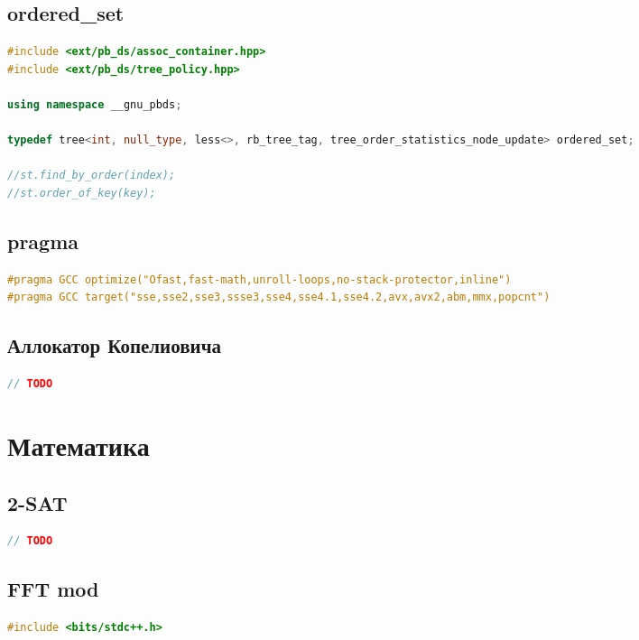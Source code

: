 \documentclass[10pt,a4paper,landscape,twosided]{extarticle}
\begin{document}
\begin{multicols*}{3}
\begin{lstlisting}[language=C++]
\end{lstlisting}

\subsection{ordered\_set}
\begin{lstlisting}[language=C++]
#include <ext/pb_ds/assoc_container.hpp>
#include <ext/pb_ds/tree_policy.hpp>

using namespace __gnu_pbds;

typedef tree<int, null_type, less<>, rb_tree_tag, tree_order_statistics_node_update> ordered_set;

//st.find_by_order(index);
//st.order_of_key(key);

\end{lstlisting}

\subsection{pragma}
\begin{lstlisting}[language=C++]
#pragma GCC optimize("Ofast,fast-math,unroll-loops,no-stack-protector,inline")
#pragma GCC target("sse,sse2,sse3,ssse3,sse4,sse4.1,sse4.2,avx,avx2,abm,mmx,popcnt")

\end{lstlisting}

\subsection{Аллокатор Копелиовича}
\begin{lstlisting}[language=C++]
// TODO

\end{lstlisting}

\section{Математика}

\subsection{2-SAT}
\begin{lstlisting}[language=C++]
// TODO

\end{lstlisting}

\subsection{FFT mod}
\begin{lstlisting}[language=C++]
#include <bits/stdc++.h>


\end{lstlisting}
\end{multicols*}
\end{document}
